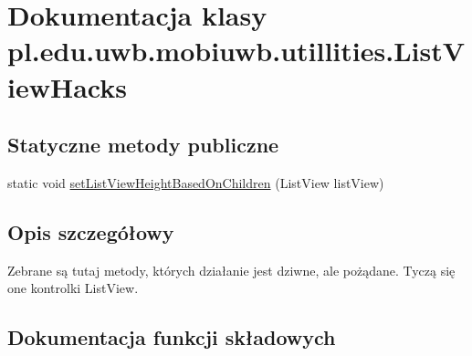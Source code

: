 \hypertarget{classpl_1_1edu_1_1uwb_1_1mobiuwb_1_1utillities_1_1_list_view_hacks}{}\section{Dokumentacja klasy pl.\+edu.\+uwb.\+mobiuwb.\+utillities.\+List\+View\+Hacks}
\label{classpl_1_1edu_1_1uwb_1_1mobiuwb_1_1utillities_1_1_list_view_hacks}
\subsection*{Statyczne metody publiczne}
\begin{DoxyCompactItemize}
\item 
static void \hyperlink{classpl_1_1edu_1_1uwb_1_1mobiuwb_1_1utillities_1_1_list_view_hacks_aa414416a76827f0fc7c49c4c2f2ea007}{set\+List\+View\+Height\+Based\+On\+Children} (List\+View list\+View)
\end{DoxyCompactItemize}


\subsection{Opis szczegółowy}
Zebrane są tutaj metody, których działanie jest dziwne, ale pożądane. Tyczą się one kontrolki List\+View. 

\subsection{Dokumentacja funkcji składowych}
\hypertarget{classpl_1_1edu_1_1uwb_1_1mobiuwb_1_1utillities_1_1_list_view_hacks_aa414416a76827f0fc7c49c4c2f2ea007}{}
